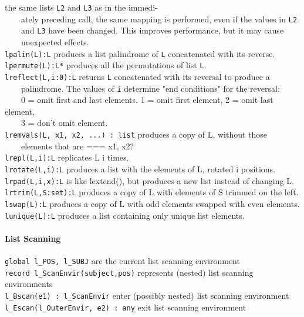 the same lists \texttt{L2} and \texttt{L3} as in the
immedi-\\
 \ \ \ \ ately preceding call, the same mapping is performed, even if
 the values in \texttt{L2} \\
 \ \ \ \ and \texttt{L3} have been changed. This improves performance,
 but it may cause \\
 \ \ \ \ unexpected effects. \\
\texttt{lpalin(L):L} produces a list palindrome of \texttt{L}
concatenated with its reverse.\\
\texttt{lpermute(L):L*} produces all the permutations of list
\texttt{L}.\\
\texttt{lreflect(L,i:0):L} returns \texttt{L} concatenated with its
reversal to produce a\\
 \ \ \ \ palindrome. The values of \texttt{i} determine
"end conditions" for the reversal:\\
 \ \ \ \ 0 = omit first and last elements. 1 = omit first element, 2 =
omit last element,\\
 \ \ \ \ 3 = don't omit element.\\
\texttt{lremvals(L, x1, x2, ...) : list} produces a copy of L, without
those\\
 \ \ \ \ elements that are === x1, x2?\\
\texttt{lrepl(L,i):L} replicates L i
times.\\
\texttt{lrotate(L,i):L} produces a list with the elements of L, rotated i
positions.\\
\texttt{lrpad(L,i,x):L} is like lextend(), but produces a new list instead of
changing L.\\
\texttt{lrtrim(L,S:set):L} produces a copy of L with elements of S trimmed on
 the left.\\
\texttt{lswap(L):L} produces a copy of L with odd elements swapped with even
elements.\\
\texttt{lunique(L):L} produces a list containing only unique list elements.

\paragraph{List Scanning}
\texttt{global l\_POS, l\_SUBJ} are the current list scanning
environment\\
\texttt{record l\_ScanEnvir(subject,pos)} represents (nested) list
scanning environments\\
\texttt{l\_Bscan(e1) : l\_ScanEnvir} enter (possibly nested) list
scanning environment\\
\texttt{l\_Escan(l\_OuterEnvir, e2) : any} exit list scanning
environment

